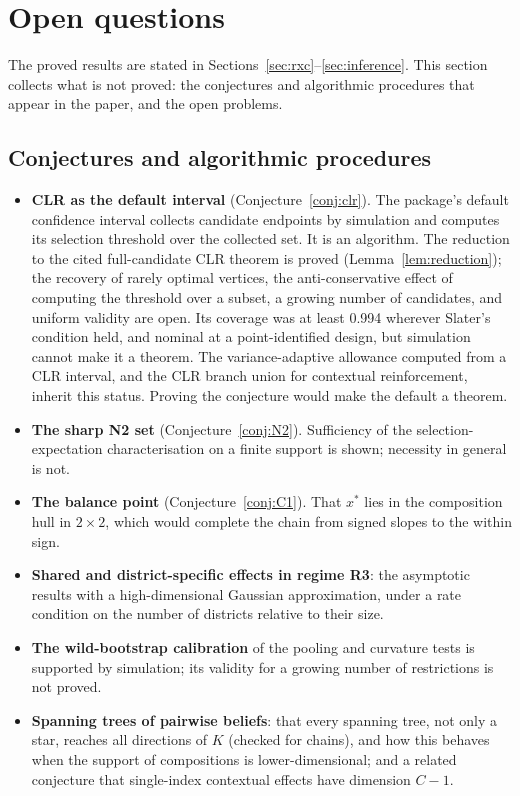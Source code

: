 \section{Open questions}\label{sec:open}

The proved results are stated in Sections~\ref{sec:rxc}--\ref{sec:inference}.
This section collects what is not proved: the conjectures and algorithmic
procedures that appear in the paper, and the open problems.

\subsection{Conjectures and algorithmic procedures}

\begin{itemize}
\item \textbf{CLR as the default interval} (Conjecture~\ref{conj:clr}). The
package's default confidence interval collects candidate endpoints by simulation
and computes its selection threshold over the collected set. It is an algorithm.
The reduction to the cited full-candidate CLR theorem is proved
(Lemma~\ref{lem:reduction}); the recovery of rarely optimal vertices, the
anti-conservative effect of computing the threshold over a subset, a growing
number of candidates, and uniform validity are open. Its coverage was at least
0.994 wherever Slater's condition held, and nominal at a point-identified design,
but simulation cannot make it a theorem. The variance-adaptive allowance computed
from a CLR interval, and the CLR branch union for contextual reinforcement,
inherit this status. Proving the conjecture would make the default a theorem.
\item \textbf{The sharp N2 set} (Conjecture~\ref{conj:N2}). Sufficiency of the
selection-expectation characterisation on a finite support is shown; necessity in
general is not.
\item \textbf{The balance point} (Conjecture~\ref{conj:C1}). That $x^*$ lies in the
composition hull in $2\times2$, which would complete the chain from signed slopes to
the within sign.
\item \textbf{Shared and district-specific effects in regime R3}: the asymptotic
results with a high-dimensional Gaussian approximation, under a rate condition on
the number of districts relative to their size.
\item \textbf{The wild-bootstrap calibration} of the pooling and curvature tests
is supported by simulation; its validity for a growing number of restrictions is
not proved.
\item \textbf{Spanning trees of pairwise beliefs}: that every spanning tree, not
only a star, reaches all directions of $K$ (checked for chains), and how this
behaves when the support of compositions is lower-dimensional; and a related
conjecture that single-index contextual effects have dimension $C-1$.
\end{itemize}

